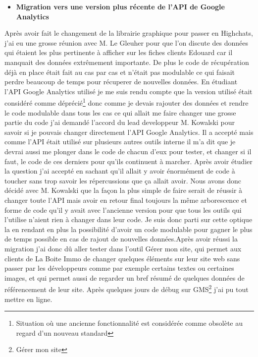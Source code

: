 \documentclass[12pt]{article}
\begin{document}
\begin{itemize}
\item \textbf{Migration vers une version plus récente de l'API de Google Analytics}
\end{itemize}
Après avoir fait le changement de la librairie graphique pour passer en Highchats, j'ai eu une grosse réunion avec  M. Le Gleuher pour que l'on discute des données qui étaient les plus pertinente à afficher sur les fiches clients Edouard car il manquait des données extrêmement importante. De plus le code de récupération déjà en place était fait au cas par cas et n'était pas modulable ce qui faisait perdre beaucoup de temps pour récuperer de nouvelles données. En étudiant l'API Google Analytics utilisé je me suis rendu compte que la version utilisé était considéré comme déprécié\footnote{Situation où une ancienne fonctionnalité est considérée comme obsolète au regard d'un nouveau standard} donc comme je devais rajouter des données et rendre le code modulable dans tous les cas ce qui allait me faire changer une grosse partie du code j'ai demandé l'accord du  lead developpeur M. Kowalski pour savoir si je pouvais changer directement l'API Google Analytics. Il a accepté mais comme l'API était utilisé sur plusieurs autres outils interne il m'a dit que je devrai aussi me plonger dans le code de chacun d'eux pour tester, et changer si il faut, le code de ces derniers pour qu'ils continuent à marcher. Après avoir étudier la question j'ai accepté en sachant qu'il allait y avoir énormément de code  à toucher sans trop savoir les répercussions que ça allait avoir. Nous avons donc décidé avec M. Kowalski que la façon la plus simple de faire serait de réussir à changer toute l'API mais avoir en retour final toujours la même arborescence et forme de code qu'il y avait avec l'ancienne version pour que tous les outils qui l'utilise n'aient rien à changer dans leur code. Je suis donc parti sur cette optique la en rendant en plus la possibilité d'avoir un code modulable pour gagner le plus de temps possible en cas de rajout de nouvelles données.Après avoir réussi la migration j'ai donc dû aller tester dans l'outil Gérer mon site, qui permet aux clients de La Boite Immo de changer quelques éléments sur leur site web sans passer par les développeurs comme par exemple certains textes ou certaines images, et qui permet aussi de regarder un bref résumé de quelques données de référencement de leur site. Après quelques jours de débug sur GMS\footnote{Gérer mon site} j'ai pu tout mettre en ligne.

\newpage
\end{document}
